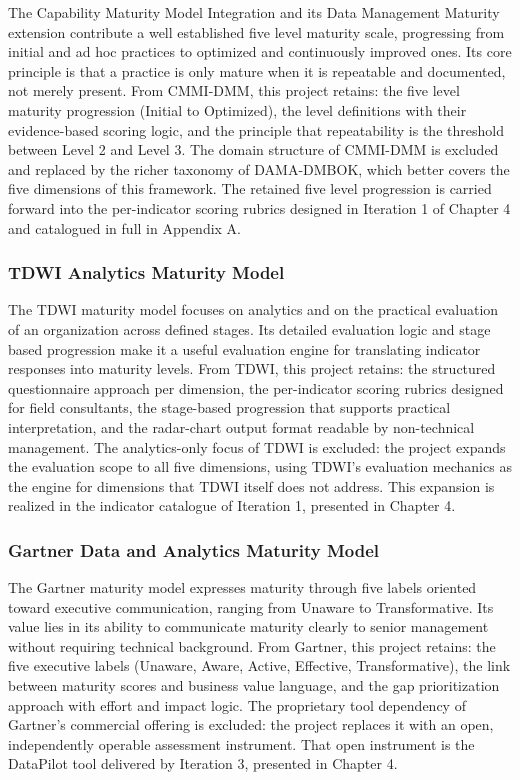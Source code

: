 The Capability Maturity Model Integration and its Data Management Maturity extension \cite{cmmi} contribute a well established five level maturity scale, progressing from initial and ad hoc practices to optimized and continuously improved ones. Its core principle is that a practice is only mature when it is repeatable and documented, not merely present. From CMMI-DMM, this project retains: the five level maturity progression (Initial to Optimized), the level definitions with their evidence-based scoring logic, and the principle that repeatability is the threshold between Level 2 and Level 3. The domain structure of CMMI-DMM is excluded and replaced by the richer taxonomy of DAMA-DMBOK, which better covers the five dimensions of this framework. The retained five level progression is carried forward into the per-indicator scoring rubrics designed in Iteration 1 of Chapter 4 and catalogued in full in Appendix A.

\subsubsection{TDWI Analytics Maturity Model}

The TDWI maturity model \cite{tdwi} focuses on analytics and on the practical evaluation of an organization across defined stages. Its detailed evaluation logic and stage based progression make it a useful evaluation engine for translating indicator responses into maturity levels. From TDWI, this project retains: the structured questionnaire approach per dimension, the per-indicator scoring rubrics designed for field consultants, the stage-based progression that supports practical interpretation, and the radar-chart output format readable by non-technical management. The analytics-only focus of TDWI is excluded: the project expands the evaluation scope to all five dimensions, using TDWI's evaluation mechanics as the engine for dimensions that TDWI itself does not address. This expansion is realized in the indicator catalogue of Iteration 1, presented in Chapter 4.

\subsubsection{Gartner Data and Analytics Maturity Model}

The Gartner maturity model \cite{gartner} expresses maturity through five labels oriented toward executive communication, ranging from Unaware to Transformative. Its value lies in its ability to communicate maturity clearly to senior management without requiring technical background. From Gartner, this project retains: the five executive labels (Unaware, Aware, Active, Effective, Transformative), the link between maturity scores and business value language, and the gap prioritization approach with effort and impact logic. The proprietary tool dependency of Gartner's commercial offering is excluded: the project replaces it with an open, independently operable assessment instrument. That open instrument is the DataPilot tool delivered by Iteration 3, presented in Chapter 4.

